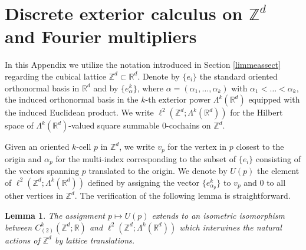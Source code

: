 \documentclass[11pt,reqno]{amsart}
\numberwithin{equation}{section}
\newtheorem{lemma}[theorem]{Lemma}
\theoremstyle{remark}
\theoremstyle{rmdefinition}
\begin{document}
\appendix
\section{Discrete exterior calculus on $\mathbb{Z}^d$ and Fourier multipliers}\label{appedsec}
In this Appendix we utilize the notation introduced in Section \ref{limmeassect} regarding the cubical lattice $\mathbb{Z}^d\subset\mathbb{R}^d$. Denote by $\{e_i\}$ the standard oriented orthonormal basis in $\mathbb{R}^d$ and by $\{e^{k}_\alpha\}$, where $\alpha=(\alpha_1,\ldots,\alpha_k)$ with $\alpha_1<\dots<\alpha_k$, the induced orthonormal basis in the $k$-th exterior power $\Lambda^k(\mathbb{R}^d)$ equipped with the induced Euclidean product. We write $\ell^2(\mathbb{Z}^d;\Lambda^k(\mathbb{R}^d))$ for the Hilbert space of $\Lambda^k(\mathbb{R}^d)$-valued square summable 0-cochains on $\mathbb{Z}^d$.

Given an oriented $k$-cell $p$ in $\mathbb{Z}^d$, we write $v_p$ for the vertex in $p$ closest to the origin and $\alpha_p$ for the multi-index corresponding to the subset of $\{e_i\}$ consisting of the vectors spanning $p$ translated to the origin. We denote by $U(p)$ the element of $\ell^2(\mathbb{Z}^d;\Lambda^k(\mathbb{R}^d))$ defined by assigning
the vector $\{e^{k}_{\alpha_p}\}$ to $v_p$ and 0 to all other vertices in $\mathbb{Z}^d$. The verification of the following lemma is straightforward.

\begin{lemma}\label{ideexterandk}
The assignment $p \mapsto U(p)$ extends to an isometric isomorphism between
$C^k_{(2)} (\mathbb{Z}^d;\mathbb{R})$
and $\ell^2(\mathbb{Z}^d;\Lambda^k(\mathbb{R}^d))$ which interwines the natural actions of $\mathbb{Z}^d$ by lattice translations.
\end{lemma}
\end{document}

